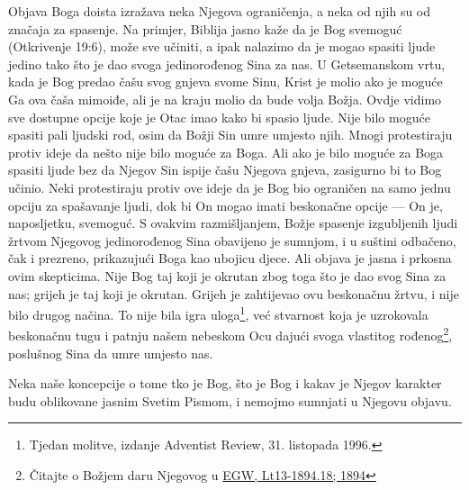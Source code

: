 Objava Boga doista izražava neka Njegova ograničenja, a neka od njih su od značaja za spasenje. Na primjer, Biblija jasno kaže da je Bog svemoguć (Otkrivenje 19:6), može sve učiniti, a ipak nalazimo da je mogao spasiti ljude jedino tako što je dao svoga jedinorođenog Sina za nas. U Getsemanskom vrtu, kada je Bog predao čašu svog gnjeva svome Sinu, Krist je molio ako je moguće Ga ova čaša mimoiđe, ali je na kraju molio da bude volja Božja. Ovdje vidimo sve dostupne opcije koje je Otac imao kako bi spasio ljude. Nije bilo moguće spasiti pali ljudski rod, osim da Božji Sin umre umjesto njih. Mnogi protestiraju protiv ideje da nešto nije bilo moguće za Boga. Ali ako je bilo moguće za Boga spasiti ljude bez da Njegov Sin ispije čašu Njegova gnjeva, zasigurno bi to Bog učinio. Neki protestiraju protiv ove ideje da je Bog bio ograničen na samo jednu opciju za spašavanje ljudi, dok bi On mogao imati beskonačne opcije — On je, naposljetku, svemoguć. S ovakvim razmišljanjem, Božje spasenje izgubljenih ljudi žrtvom Njegovog jedinorođenog Sina obavijeno je sumnjom, i u suštini odbačeno, čak i prezreno, prikazujući Boga kao ubojicu djece. Ali objava je jasna i prkosna ovim skepticima. Nije Bog taj koji je okrutan zbog toga što je dao svog Sina za nas; grijeh je taj koji je okrutan. Grijeh je zahtijevao ovu beskonačnu žrtvu, i nije bilo drugog načina. To nije bila igra uloga\footnote{Tjedan molitve, izdanje Adventist Review, 31. listopada 1996.}, već stvarnost koja je uzrokovala beskonačnu tugu i patnju našem nebeskom Ocu dajući svoga vlastitog rođenog\footnote{Čitajte o Božjem daru Njegovog  u \href{https://egwwritings.org/?ref=en_Lt13-1894.18&para=5486.24}{{EGW, Lt13-1894.18; 1894}}}, poslušnog Sina da umre umjesto nas.

Neka naše koncepcije o tome tko je Bog, što je Bog i kakav je Njegov karakter budu oblikovane jasnim Svetim Pismom, i nemojmo sumnjati u Njegovu objavu.
